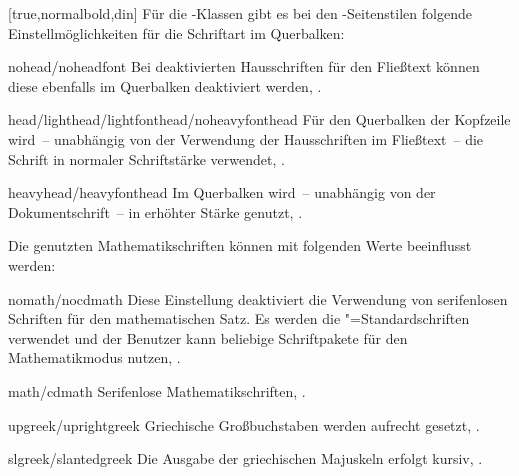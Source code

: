 \begin{Declaration*}{}
\begin{Declaration*}{}
\begin{Declaration*}{}
\begin{Declaration}[%
  v2.02!\Option{cdfont=head};
  v2.02!\Option{cdfont=heavyhead};
  v2.03!\Option{cdfont=din};
  v2.03!\Option{cdfont=nodin};
  v2.05!\Option{cdfont=normalbold};
  v2.05!\Option{cdfont=ultrabold};
]{}[true,normalbold,din]
Für die \TUDScript-Klassen gibt es bei den -Seitenstilen 
folgende Einstellmöglichkeiten für die Schriftart im Querbalken:
%
\begin{values}{}
\item[nohead/noheadfont]
  Bei deaktivierten Hausschriften für den Fließtext können diese ebenfalls im 
  Querbalken deaktiviert werden, .
\item[head/lighthead/lightfonthead/noheavyfonthead]
  Für den Querbalken der Kopfzeile wird~-- unabhängig von der Verwendung der 
  Hausschriften im Fließtext~-- die Schrift \Univers in normaler Schriftstärke 
  verwendet, .
\item[heavyhead/heavyfonthead]
  Im Querbalken wird~-- unabhängig von der Dokumentschrift~-- \Univers in 
  erhöhter Stärke genutzt, .
\end{values}
%
Die genutzten Mathematikschriften können mit folgenden Werte beeinflusst werden:
%
\begin{values}{}
\item[nomath/nocdmath] 
  Diese Einstellung deaktiviert die Verwendung von serifenlosen Schriften für 
  den mathematischen Satz. Es werden die "=Standardschriften 
  verwendet und der Benutzer kann beliebige Schriftpakete für den 
  Mathematikmodus nutzen, .
\item[math/cdmath]
  Serifenlose Mathematikschriften, .
\item[upgreek/uprightgreek]
  Griechische Großbuchstaben werden aufrecht gesetzt, 
  .
\item[slgreek/slantedgreek]
  Die Ausgabe der griechischen Majuskeln erfolgt kursiv, 
  .
\end{values}
\end{Declaration}



\end{Declaration*}
\end{Declaration*}
\end{Declaration*}
